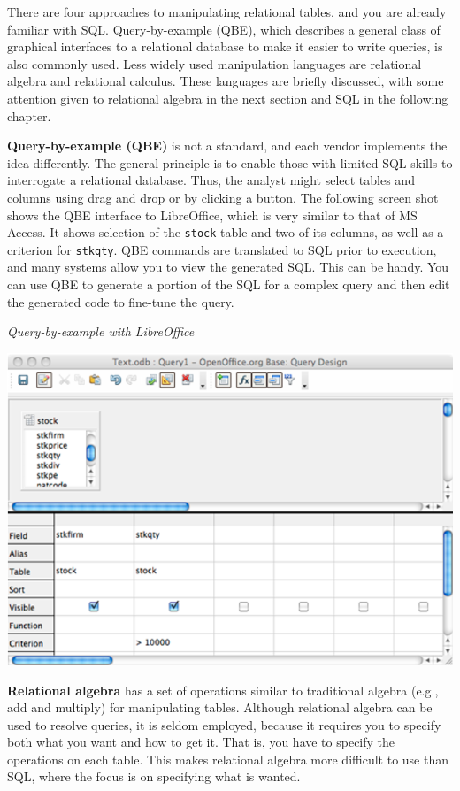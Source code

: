 \documentclass[
]{article}
\begin{document}
There are four approaches to manipulating relational tables, and you are
already familiar with SQL. Query-by-example (QBE), which describes a
general class of graphical interfaces to a relational database to make
it easier to write queries, is also commonly used. Less widely used
manipulation languages are relational algebra and relational calculus.
These languages are briefly discussed, with some attention given to
relational algebra in the next section and SQL in the following chapter.

\textbf{Query-by-example (QBE)} is not a standard, and each vendor implements
the idea differently. The general principle is to enable those with
limited SQL skills to interrogate a relational database. Thus, the
analyst might select tables and columns using drag and drop or by
clicking a button. The following screen shot shows the QBE interface to
LibreOffice, which is very similar to that of MS Access. It shows
selection of the \texttt{stock} table and two of its columns, as well as a
criterion for \texttt{stkqty}. QBE commands are translated to SQL prior to
execution, and many systems allow you to view the generated SQL. This
can be handy. You can use QBE to generate a portion of the SQL for a
complex query and then edit the generated code to fine-tune the query.

\emph{Query-by-example with LibreOffice}

\includegraphics{Figures/Chapter 9/query-by-example.png}

\textbf{Relational algebra} has a set of operations similar to traditional
algebra (e.g., add and multiply) for manipulating tables. Although
relational algebra can be used to resolve queries, it is seldom
employed, because it requires you to specify both what you want and how
to get it. That is, you have to specify the operations on each table.
This makes relational algebra more difficult to use than SQL, where the
focus is on specifying what is wanted.
\end{document}
